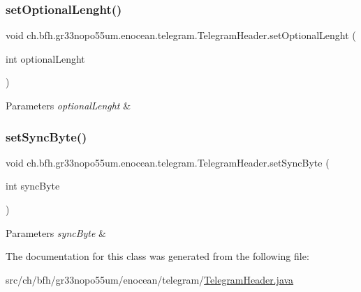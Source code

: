 \subsubsection{\texorpdfstring{set\+Optional\+Lenght()}{setOptionalLenght()}}
{\footnotesize\ttfamily void ch.\+bfh.\+gr33nopo55um.\+enocean.\+telegram.\+Telegram\+Header.\+set\+Optional\+Lenght (\begin{DoxyParamCaption}\item[{int}]{optional\+Lenght }\end{DoxyParamCaption})}


\begin{DoxyParams}{Parameters}
{\em optional\+Lenght} & \\
\hline
\end{DoxyParams}
\hypertarget{classch_1_1bfh_1_1gr33nopo55um_1_1enocean_1_1telegram_1_1_telegram_header_ae1abe768269fb7d40258861156eb8988}{}\label{classch_1_1bfh_1_1gr33nopo55um_1_1enocean_1_1telegram_1_1_telegram_header_ae1abe768269fb7d40258861156eb8988} 
\subsubsection{\texorpdfstring{set\+Sync\+Byte()}{setSyncByte()}}
{\footnotesize\ttfamily void ch.\+bfh.\+gr33nopo55um.\+enocean.\+telegram.\+Telegram\+Header.\+set\+Sync\+Byte (\begin{DoxyParamCaption}\item[{int}]{sync\+Byte }\end{DoxyParamCaption})}


\begin{DoxyParams}{Parameters}
{\em sync\+Byte} & \\
\hline
\end{DoxyParams}


The documentation for this class was generated from the following file\+:\begin{DoxyCompactItemize}
\item 
src/ch/bfh/gr33nopo55um/enocean/telegram/\hyperlink{_telegram_header_8java}{Telegram\+Header.\+java}\end{DoxyCompactItemize}

